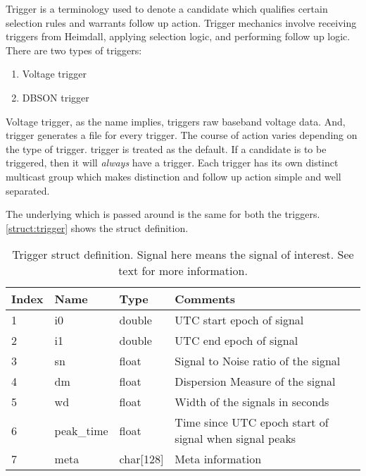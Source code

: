 \par Trigger is a terminology used to denote a candidate which qualifies certain selection rules and warrants follow up action. Trigger mechanics involve receiving triggers from Heimdall, applying selection logic, and performing follow up logic. 
There are two types of triggers: 
\begin{enumerate}
	\item Voltage trigger
	\item DBSON trigger
\end{enumerate}
Voltage trigger, as the name implies, triggers raw baseband voltage data. And, \dbson trigger generates a \dbson file for every trigger. The course of action varies depending on the type of trigger. 
\dbson trigger is treated as the default. If a candidate is to be triggered, then it will \emph{always} have a \dbson trigger.
Each trigger has its own distinct multicast group which makes distinction and follow up action simple and well separated.

\par The underlying \struct which is passed around is the same for both the triggers. \autoref{struct:trigger} shows the struct definition. 
\begin{table}
	\begin{tabular}{llll} \toprule
			Index & Name       & Type          & Comments                                               \\ \midrule
			1     & i0         & double        & UTC start epoch of signal                              \\
			2     & i1         & double        & UTC end   epoch of signal                              \\
			3     & sn         & float         & Signal to Noise ratio of the signal                    \\
			4     & dm         & float         & Dispersion Measure of the signal                       \\
			5     & wd         & float         & Width of the signals in seconds                        \\
			6     & peak\_time & float         & Time since UTC epoch start of signal when signal peaks \\
			7     & meta       & char{[}128{]} & Meta information                                      
			\bottomrule
	\end{tabular}
	\caption {Trigger struct definition. Signal here means the signal of interest. See text for more information.}
	\label{struct:trigger}
\end{table}

